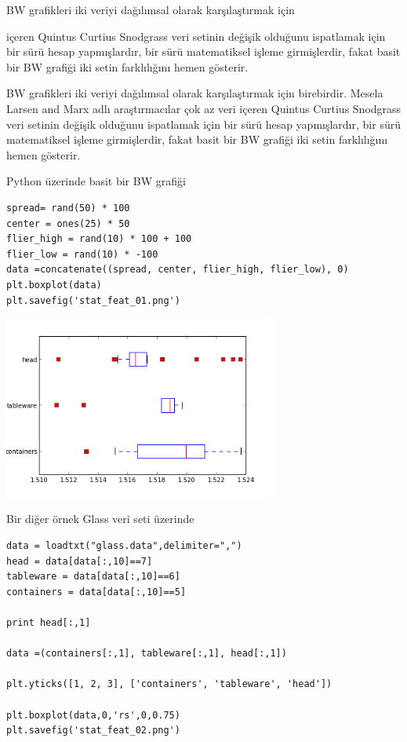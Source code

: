 \documentclass[12pt,fleqn]{article}\usepackage{../../common}
\begin{document}
BW grafikleri iki veriyi dağılımsal olarak karşılaştırmak için

içeren Quintus Curtius Snodgrass veri setinin değişik olduğunu
ispatlamak için bir sürü hesap yapmışlardır, bir sürü matematiksel
işleme girmişlerdir, fakat basit bir BW grafiği iki setin farklılığını
hemen gösterir.

BW grafikleri iki veriyi dağılımsal olarak karşılaştırmak için
birebirdir. Mesela Larsen and Marx adlı araştırmacılar çok az veri
içeren Quintus Curtius Snodgrass veri setinin değişik olduğunu
ispatlamak için bir sürü hesap yapmışlardır, bir sürü matematiksel
işleme girmişlerdir, fakat basit bir BW grafiği iki setin farklılığını
hemen gösterir.

Python üzerinde basit bir BW grafiği 

\begin{verbatim}
spread= rand(50) * 100
center = ones(25) * 50
flier_high = rand(10) * 100 + 100
flier_low = rand(10) * -100
data =concatenate((spread, center, flier_high, flier_low), 0)
plt.boxplot(data)
plt.savefig('stat_feat_01.png')
\end{verbatim}

\includegraphics[height=6cm]{stat_feat_01.png}

Bir diğer örnek Glass veri seti üzerinde

\begin{verbatim}
data = loadtxt("glass.data",delimiter=",")
head = data[data[:,10]==7]
tableware = data[data[:,10]==6]
containers = data[data[:,10]==5]

print head[:,1]

data =(containers[:,1], tableware[:,1], head[:,1])

plt.yticks([1, 2, 3], ['containers', 'tableware', 'head'])

plt.boxplot(data,0,'rs',0,0.75)
plt.savefig('stat_feat_02.png')
\end{verbatim}
\end{document}
